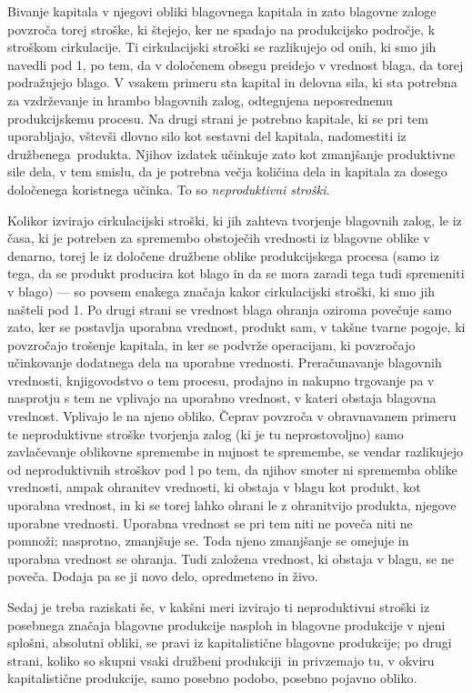 \documentclass[kapital_02.tex]{subfiles}
\begin{document}
Bivanje kapitala v njegovi obliki blagovnega kapitala in zato blagovne zaloge povzroča torej stroške, ki štejejo, ker ne spadajo na produkcijsko področje, k stroškom cirkulacije.
Ti cirkulacijski stroški se razlikujejo od onih, ki smo jih navedli pod 1, po tem, da v določenem obsegu preidejo v vrednost blaga, da torej podražujejo blago. %
V vsakem primeru sta kapital in delovna sila, ki sta potrebna za vzdrževanje in hrambo blagovnih zalog, odtegnjena neposrednemu produkcijskemu procesu.
Na drugi strani je potrebno kapitale, ki se pri tem uporabljajo, vštevši dlovno silo kot sestavni del kapitala, nadomestiti iz družbenega\KPEstran\ produkta.
Njihov izdatek učinkuje zato kot zmanjšanje produktivne sile dela, v tem smislu, da je potrebna večja količina dela in kapitala za dosego določenega koristnega učinka.
To so \emph{neproduktivni stroški}.

Kolikor izvirajo cirkulacijski stroški, ki jih zahteva tvorjenje blagovnih zalog, le iz časa, ki je potreben za spremembo obstoječih vrednosti iz blagovne oblike v denarno, torej le iz določene družbene oblike produkcijskega procesa (samo iz tega, da se produkt producira kot blago in da se mora zaradi tega tudi spremeniti v blago) — so povsem enakega značaja kakor cirkulacijski stroški, ki smo jih našteli pod 1. 
Po drugi strani se vrednost blaga ohranja oziroma povečuje samo zato, ker se postavlja uporabna vrednost, produkt sam, v takšne tvarne pogoje, ki povzročajo trošenje kapitala, in ker se podvrže operacijam, ki povzročajo učinkovanje dodatnega dela na uporabne vrednosti.
Preračunavanje blagovnih vrednosti, knjigovodstvo o tem procesu, prodajno in nakupno trgovanje pa v nasprotju s tem ne vplivajo na uporabno vrednost, v kateri obstaja blagovna vrednost.
Vplivajo le na njeno obliko.
Čeprav povzroča v obravnavanem primeru te neproduktivne stroške tvorjenja zalog (ki je tu neprostovoljno) samo zavlačevanje oblikovne spremembe in nujnost te spremembe, se vendar razlikujejo od neproduktivnih stroškov pod l po tem, da njihov smoter ni sprememba oblike vrednosti, ampak ohranitev vrednosti, ki obstaja v blagu kot produkt, kot uporabna vrednost, in ki se torej lahko ohrani le z ohranitvijo produkta, njegove uporabne vrednosti.
Uporabna vrednost se pri tem niti ne poveča niti ne pomnoži;
nasprotno, zmanjšuje se.
Toda njeno zmanjšanje se omejuje in uporabna vrednost se ohranja. Tudi založena vrednost, ki obstaja v blagu, se ne poveča.
Dodaja pa se ji novo delo, opredmeteno in živo.

Sedaj je treba raziskati še, v kakšni meri izvirajo ti neproduktivni stroški iz posebnega značaja blagovne produkcije nasploh in blagovne produkcije v njeni splošni, absolutni obliki, se pravi iz kapitalistične blagovne produkcije; po drugi strani, koliko so skupni vsaki družbeni produkciji\KPEstran\ in privzemajo tu, v okviru kapitalistične produkcije, samo posebno podobo, posebno pojavno obliko.
\end{document}
